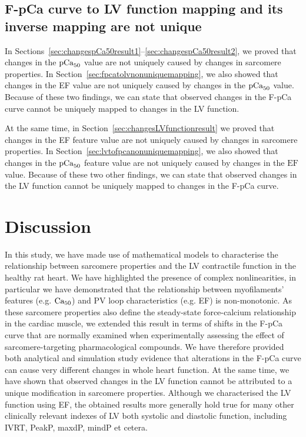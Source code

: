 %
%
%
\subsection{F-pCa curve to LV function mapping and its inverse mapping are not unique}\label{sec:ch8nonuniquemappings}
In Sections~\ref{sec:changespCa50result1}--\ref{sec:changespCa50result2}, we proved that changes in the $\textrm{pCa}_{50}$ value are not uniquely caused by changes in sarcomere properties. In Section~\ref{sec:fpcatolvnonuniquemapping}, we also showed that changes in the EF value are not uniquely caused by changes in the $\textrm{pCa}_{50}$ value. Because of these two findings, we can state that observed changes in the F-pCa curve cannot be uniquely mapped to changes in the LV function.

\vspace{0.2cm}
At the same time, in Section~\ref{sec:changesLVfunctionresult} we proved that changes in the EF feature value are not uniquely caused by changes in sarcomere properties. In Section~\ref{sec:lvtofpcanonuniquemapping}, we also showed that changes in the $\textrm{pCa}_{50}$ feature value are not uniquely caused by changes in the $\textrm{EF}$ value. Because of these two other findings, we can state that observed changes in the LV function cannot be uniquely mapped to changes in the F-pCa curve.


%
%
%
\section{Discussion}\label{sec:ch8discussion}
In this study, we have made use of mathematical models to characterise the relationship between sarcomere properties and the LV contractile function in the healthy rat heart. We have highlighted the presence of complex nonlinearities, in particular we have demonstrated that the relationship between myofilaments' features (e.g. $\textrm{Ca}_{50}$) and PV loop characteristics (e.g. EF) is non-monotonic. As these sarcomere properties also define the steady-state force-calcium relationship in the cardiac muscle, we extended this result in terms of shifts in the F-pCa curve that are normally examined when experimentally assessing the effect of sarcomere-targeting pharmacological compounds. We have therefore provided both analytical and simulation study evidence that alterations in the F-pCa curve can cause very different changes in whole heart function. At the same time, we have shown that observed changes in the LV function cannot be attributed to a unique modification in sarcomere properties. Although we characterised the LV function using EF, the obtained results more generally hold true for many other clinically relevant indexes of LV both systolic and diastolic function, including IVRT, PeakP, maxdP, mindP et cetera.

